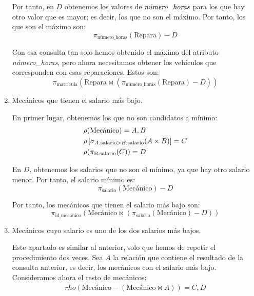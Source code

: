 \begin{ejercicio}
\begin{enumerate}
        Por tanto, en $D$ obtenemos los valores de $\emph{número\_horas}$ para los que hay otro valor que es mayor; es decir,
        los que no son el máximo. Por tanto, los que son el máximo son:
        \begin{equation*}
            \pi_{\text{número\_horas}}(\text{Repara})-D
        \end{equation*}

        Con esa consulta tan solo hemos obtenido el máximo del atributo \emph{número\_horas}, pero ahora necesitamos obtener los vehículos
        que corresponden con esas reparaciones. Estos son:
        \begin{equation*}
            \pi_{\text{matrícula}}(\text{Repara}\bowtie (\pi_{\text{número\_horas}}(\text{Repara})-D))
        \end{equation*}
        \item Mecánicos que tienen el salario más bajo.
        
        En primer lugar, obtenemos los que no son candidatos a mínimo:
        \begin{align*}
            & \rho(\text{Mecánico}) = A,B\\
            & \rho\left[\sigma_{A.\text{salario} > B.\text{salario}}(A \times B)\right] = C\\
            & \rho(\pi_{\text{B.\text{salario}}}(C)) = D
        \end{align*}

        En $D$, obtenemos los salarios que no son el mínimo, ya que hay otro salario menor.
        Por tanto, el salario mínimo es:
        \begin{equation*}
            \pi_{\text{salario}}(\text{Mecánico})-D
        \end{equation*}

        Por tanto, los mecánicos que tienen el salario más bajo son:
        \begin{equation*}
            \pi_{\text{id\_mecánico}}(\text{Mecánico}\bowtie (\pi_{\text{salario}}(\text{Mecánico})-D))
        \end{equation*}
        \item Mecánicos cuyo salario es uno de los dos salarios más bajos.
        
        Este apartado es similar al anterior, solo que hemos de repetir el procedimiento dos veces.
        Sea $A$ la relación que contiene el resultado de la consulta anterior, es decir, los mecánicos con el salario más bajo.
        Consideramos ahora el resto de mecánicos:
        \begin{align*}
             rho(\text{Mecánico}-(\text{Mecánico}\bowtie A)) = C,D
        \end{align*}


\end{enumerate}
\end{ejercicio}
